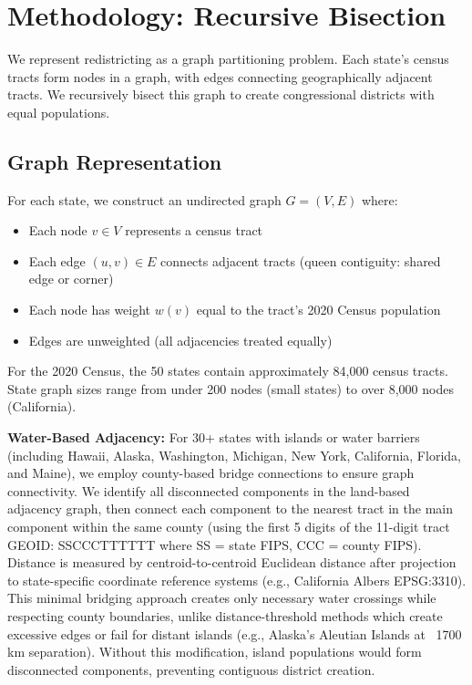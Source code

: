 \section{Methodology: Recursive Bisection}
\label{sec:methodology}

We represent redistricting as a graph partitioning problem. Each state's census tracts form nodes in a graph, with edges connecting geographically adjacent tracts. We recursively bisect this graph to create congressional districts with equal populations.

\subsection{Graph Representation}

For each state, we construct an undirected graph $G = (V, E)$ where:
\begin{itemize}
    \item Each node $v \in V$ represents a census tract
    \item Each edge $(u, v) \in E$ connects adjacent tracts (queen contiguity: shared edge or corner)
    \item Each node has weight $w(v)$ equal to the tract's 2020 Census population \cite{census2020redistricting}
    \item Edges are unweighted (all adjacencies treated equally)
\end{itemize}

For the 2020 Census, the 50 states contain approximately 84,000 census tracts. State graph sizes range from under 200 nodes (small states) to over 8,000 nodes (California).

\textbf{Water-Based Adjacency:} For 30+ states with islands or water barriers (including Hawaii, Alaska, Washington, Michigan, New York, California, Florida, and Maine), we employ county-based bridge connections to ensure graph connectivity. We identify all disconnected components in the land-based adjacency graph, then connect each component to the nearest tract in the main component within the same county (using the first 5 digits of the 11-digit tract GEOID: SSCCCTTTTTT where SS = state FIPS, CCC = county FIPS). Distance is measured by centroid-to-centroid Euclidean distance after projection to state-specific coordinate reference systems (e.g., California Albers EPSG:3310). This minimal bridging approach creates only necessary water crossings while respecting county boundaries, unlike distance-threshold methods which create excessive edges or fail for distant islands (e.g., Alaska's Aleutian Islands at ~1700 km separation). Without this modification, island populations would form disconnected components, preventing contiguous district creation.

